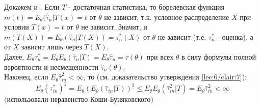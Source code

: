 \begin{Proof}
	Докажем  и . Если $T$ - достаточная статистика, то борелевская функция $\displaystyle m(t) = E_{\theta} (\hat{\tau}_n | T(x) = t$ от $\theta$ не зависит, т.к. условное распределение $X$ при условии $T(x) = t$ от $\theta$ не зависит. Значит, и $\displaystyle m(T(X)) = E_{\theta} (\hat{\tau}_n| T(X)) = \tau_n^* (X)$ от $\theta$ не зависит (т.е. $\tau_n^*$ - оценка), а от $X$ зависит лишь через $T(X)$.\\
	Далее, $\displaystyle E_{\theta} \tau_n^* = E_{\theta} E_{\theta} (\hat{\tau}_n | T) = E_{\theta} \hat{\tau}_n = \tau(\theta)$ при всех $\theta$ в силу формулы полной вероятности и несмещенности $\hat{\tau}_n (\theta)$.\\
	Наконец, если $\displaystyle E_{\theta} \hat{\tau}_{in}^2 < \infty$, то (см. доказательство утверждения \ref{lec:6/clair:7}):
	$$E_{\theta} \left( \tau_{in}^* \right)^2 = E_{\theta} \left( E_{\theta} \left( \hat{\tau}_{in} | T \right) \right)^2 \le E_{\theta} E_{\theta} \left( \hat{\tau}_{in}^2 | T \right) = E_{\theta} \hat{\tau}_{in}^2 < \infty$$
	$($использовали неравенство Коши-Буняковского$)$\\


\end{Proof}
